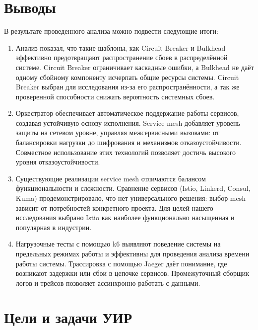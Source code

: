 \section{Выводы}

В результате проведенного анализа можно подвести следующие итоги:
\begin{enumerate}
    \item Анализ показал, что такие шаблоны, как Circuit Breaker и Bulkhead эффективно предотвращают распространение сбоев в распределённой системе. Circuit Breaker ограничивает каскадные ошибки, а Bulkhead не даёт одному сбойному компоненту исчерпать общие ресурсы системы. Circuit Breaker выбран для исследования из-за его распространённости, а так же проверенной способности снижать вероятность системных сбоев.

    \item Оркестратор обеспечивает автоматическое поддержание работы сервисов, создавая устойчивую основу исполнения. Service mesh добавляет уровень защиты на сетевом уровне, управляя межсервисными вызовами: от балансировки нагрузки до шифрования и механизмов отказоустойчивости. Совместное использование этих технологий позволяет достичь высокого уровня отказоустойчивости.

    \item Существующие реализации service mesh отличаются балансом функциональности и сложности. Сравнение сервисов (Istio, Linkerd, Consul, Kuma) продемонстрировало, что нет универсального решения: выбор mesh зависит от потребностей конкретного проекта. Для целей нашего исследования выбрано Istio как наиболее функционально насыщенная и популярная в индустрии.

    \item Нагрузочные тесты с помощью k6 выявляют поведение системы на предельных режимах работы и эффективны для проведения анализа времени работы системы. Трассировка с помощью Jaeger даёт понимание, где возникают задержки или сбои в цепочке сервисов. Промежуточный сборщик логов и трейсов позволяет ассинхронно работать с данными.

\end{enumerate}
\section{Цели и задачи УИР}


